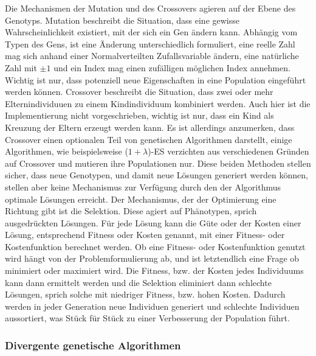 Die Mechanismen der Mutation und des Crossovers agieren auf der Ebene des Genotyps.
Mutation beschreibt die Situation, dass eine gewisse Wahrscheinlichkeit existiert, mit der sich ein Gen ändern kann. Abhängig vom Typen des Gens, ist eine Änderung unterschiedlich formuliert, eine reelle Zahl mag sich anhand einer Normalverteilten Zufallsvariable ändern, eine natürliche Zahl mit $\pm1$ und ein Index mag einen zufälligen möglichen Index annehmen. Wichtig ist nur, dass potenziell neue Eigenschaften in eine Population eingeführt werden können.
Crossover beschreibt die Situation, dass zwei oder mehr Elternindividuuen zu einem Kindindividuum kombiniert werden. Auch hier ist die Implementierung nicht vorgeschrieben, wichtig ist nur, dass ein Kind als Kreuzung der Eltern erzeugt werden kann.
Es ist allerdings anzumerken, dass Crossover einen optionalen Teil von genetischen Algorithmen darstellt, einige Algorithmen, wie beispielsweise ($1 + \lambda$)-ES verzichten aus verschiedenen Gründen auf Crossover und mutieren ihre Populationen nur.
Diese beiden Methoden stellen sicher, dass neue Genotypen, und damit neue Lösungen generiert werden können, stellen aber keine Mechanismus zur Verfügung durch den der Algorithmus optimale Lösungen erreicht.
Der Mechanismus, der der Optimierung eine Richtung gibt ist die Selektion.
Diese agiert auf Phänotypen, sprich ausgedrückten Lösungen.
Für jede Lösung kann die Güte oder der Kosten einer Lösung, entsprechend Fitness oder Kosten genannt, 
mit einer Fitness- oder Kostenfunktion berechnet werden.
Ob eine Fitness- oder Kostenfunktion genutzt wird hängt von der Problemformulierung ab, und ist letztendlich eine Frage ob minimiert oder maximiert wird.
Die Fitness, bzw. der Kosten jedes Individuums kann dann ermittelt werden und die Selektion eliminiert dann schlechte Lösungen, sprich solche mit niedriger Fitness, bzw. hohen Kosten.
Dadurch werden in jeder Generation neue Individuen generiert und schlechte Individuen aussortiert, was Stück für Stück zu einer Verbesserung der Population führt.

\subsubsection{Divergente genetische Algorithmen}

